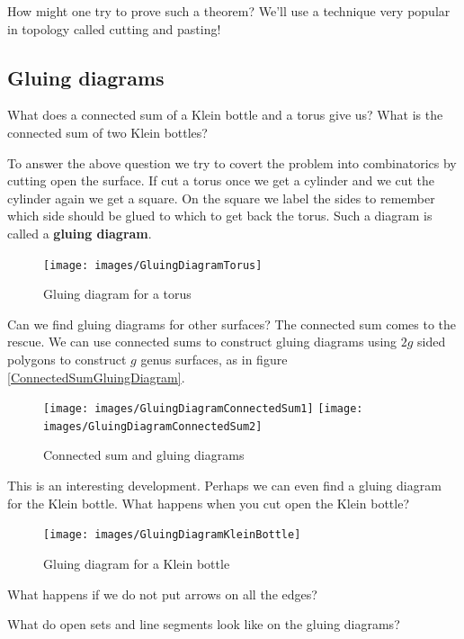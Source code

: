How might one try to prove such a theorem? We'll use a technique very popular in topology called cutting and pasting!

\subsection{Gluing diagrams}
\begin{ques}
	What does a connected sum of a Klein bottle and a torus give us? What is the connected sum of two Klein bottles?
\end{ques}

To answer the above question we try to covert the problem into combinatorics by cutting open the surface. If cut a torus once we get a cylinder and we cut the cylinder again we get a square. On the square we label the sides to remember which side should be glued to which to get back the torus. Such a diagram is called a \textbf{gluing diagram}.

\begin{figure}[H]
	\centering
	\texttt{[image: images/GluingDiagramTorus]}
	\caption{Gluing diagram for a torus}
\end{figure}

Can we find gluing diagrams for other surfaces? The connected sum comes to the rescue. We can use connected sums to construct gluing diagrams using $2g$ sided polygons to construct $g$ genus surfaces, as in figure \eqref{ConnectedSumGluingDiagram}.

\begin{figure}[h]
	\centering
	\texttt{[image: images/GluingDiagramConnectedSum1]}
	\texttt{[image: images/GluingDiagramConnectedSum2]}
	\caption{Connected sum and gluing diagrams}
	\label{ConnectedSumGluingDiagram}
\end{figure}

This is an interesting development. Perhaps we can even find a gluing diagram for the Klein bottle. What happens when you cut open the Klein bottle?

\begin{figure}[H]
	\centering
	\texttt{[image: images/GluingDiagramKleinBottle]}
	\caption{Gluing diagram for a Klein bottle}
\end{figure}

\begin{ques}
	What happens if we do not put arrows on all the edges?
\end{ques}

\begin{ques}
	What do open sets and line segments look like on the gluing diagrams?
\end{ques}

